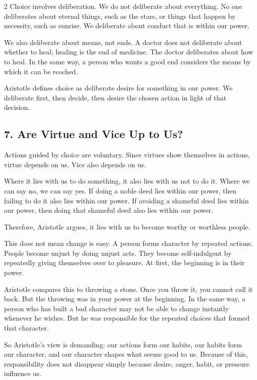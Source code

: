 \documentclass[12pt]{article}
\begin{document}
\begin{multicols}{2}
Choice involves deliberation. We do not deliberate about everything. No one deliberates about eternal things, such as the stars, or things that happen by necessity, such as sunrise. We deliberate about conduct that is within our power.

We also deliberate about means, not ends. A doctor does not deliberate about whether to heal; healing is the end of medicine. The doctor deliberates about how to heal. In the same way, a person who wants a good end considers the means by which it can be reached.

Aristotle defines choice as deliberate desire for something in our power. We deliberate first, then decide, then desire the chosen action in light of that decision.

\subsection*{7. Are Virtue and Vice Up to Us?}
Actions guided by choice are voluntary. Since virtues show themselves in actions, virtue depends on us. Vice also depends on us.

Where it lies with us to do something, it also lies with us not to do it. Where we can say no, we can say yes. If doing a noble deed lies within our power, then failing to do it also lies within our power. If avoiding a shameful deed lies within our power, then doing that shameful deed also lies within our power.

Therefore, Aristotle argues, it lies with us to become worthy or worthless people.

This does not mean change is easy. A person forms character by repeated actions. People become unjust by doing unjust acts. They become self-indulgent by repeatedly giving themselves over to pleasure. At first, the beginning is in their power.

Aristotle compares this to throwing a stone. Once you throw it, you cannot call it back. But the throwing was in your power at the beginning. In the same way, a person who has built a bad character may not be able to change instantly whenever he wishes. But he was responsible for the repeated choices that formed that character.

So Aristotle's view is demanding: our actions form our habits, our habits form our character, and our character shapes what seems good to us. Because of this, responsibility does not disappear simply because desire, anger, habit, or pressure influence us.


\end{multicols}
\end{document}
